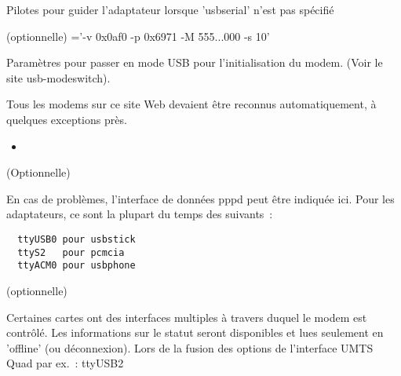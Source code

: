 \begin{description}
  Pilotes pour guider l'adaptateur lorsque 'usbserial' n'est pas spécifié


  (optionnelle) ='-v 0x0af0 -p 0x6971 -M 555...000 -s 10'

  Paramètres pour passer en mode USB pour l'initialisation du modem. 
  (Voir le site usb-modeswitch).

  Tous les modems sur ce site Web devaient être reconnus automatiquement, à
  quelques exceptions près.

  \begin{itemize}
  \item {}
  \end{itemize}


	(Optionnelle)

  En cas de problèmes, l'interface de données pppd peut être indiquée ici. Pour
  les adaptateurs, ce sont la plupart du temps des suivants~:

  \begin{verbatim}
  ttyUSB0 pour usbstick
  ttyS2   pour pcmcia
  ttyACM0 pour usbphone
  \end{verbatim}


  (optionnelle)

  Certaines cartes ont des interfaces multiples à travers duquel le modem est
  contrôlé. Les informations sur le statut seront disponibles et lues seulement
  en 'offline' (ou déconnexion). Lors de la fusion des options de l'interface
  UMTS Quad par ex.~: ttyUSB2

\end{description}

